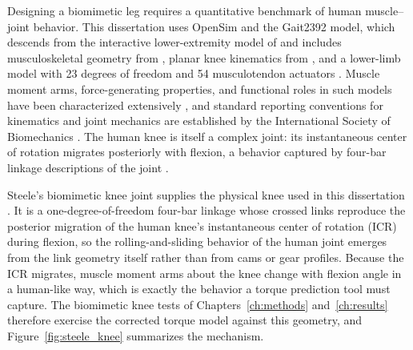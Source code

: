 Designing a biomimetic leg requires a quantitative benchmark of human muscle--joint behavior. This dissertation uses OpenSim \citep{delp_opensim_2007, seth_opensim_2011, seth_opensim_2018} and the Gait2392 model, which descends from the interactive lower-extremity model of \citet{delp_interactive_1990} and includes musculoskeletal geometry from \citet{hoy_musculoskeletal_1990}, planar knee kinematics from \citet{yamaguchi_planar_1989}, and a lower-limb model with 23 degrees of freedom and 54 musculotendon actuators \citep{arnold_model_2010}. Muscle moment arms, force-generating properties, and functional roles in such models have been characterized extensively \citep{zajac_determining_1989, brand_model_1982, menegaldo_moment_2004, millard_flexing_2013, sherman_what_2013, suderman_moving_2012}, and standard reporting conventions for kinematics and joint mechanics are established by the International Society of Biomechanics \citep{wu_for_1995, wu_isb_2002, wu_isb_2005, derrick_isb_2020}. The human knee is itself a complex joint: its instantaneous center of rotation migrates posteriorly with flexion, a behavior captured by four-bar linkage descriptions of the joint \citep{romero_four-bar_2020, steele_biomimetic_2018}.

Steele's biomimetic knee joint supplies the physical knee used in this dissertation \citep{steele_development_2017, steele_biomimetic_2018, steele_biomimetic_2018-1}. It is a one-degree-of-freedom four-bar linkage whose crossed links reproduce the posterior migration of the human knee's instantaneous center of rotation (ICR) during flexion, so the rolling-and-sliding behavior of the human joint emerges from the link geometry itself rather than from cams or gear profiles. Because the ICR migrates, muscle moment arms about the knee change with flexion angle in a human-like way, which is exactly the behavior a torque prediction tool must capture. The biomimetic knee tests of Chapters~\ref{ch:methods} and~\ref{ch:results} therefore exercise the corrected torque model against this geometry, and Figure~\ref{fig:steele_knee} summarizes the mechanism.


